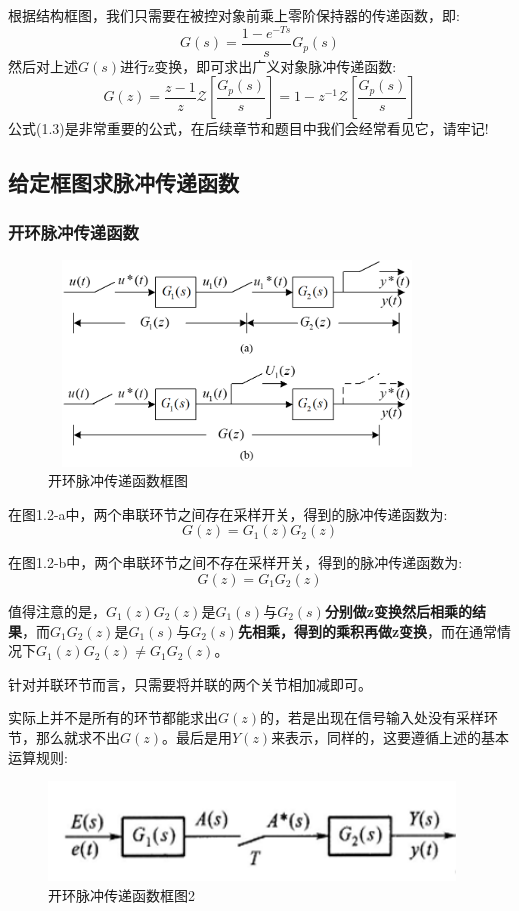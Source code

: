 \documentclass[12pt, a4paper, oneside]{ctexbook}
\begin{document}
根据结构框图，我们只需要在被控对象前乘上零阶保持器的传递函数，即:
$$
G(s)=\frac{1-e^{-Ts}}{s}G_p(s)
$$
然后对上述$G(s)$进行z变换，即可求出广义对象脉冲传递函数:
\begin{equation}
	G(z)=\frac{z-1}{z}\mathcal Z[\frac{G_p(s)}{s}] = 1-z^{-1}\mathcal Z[\frac{G_p(s)}{s}]
\end{equation}
公式(1.3)是非常重要的公式，在后续章节和题目中我们会经常看见它，请牢记!
\subsection{给定框图求脉冲传递函数}
\subsubsection{开环脉冲传递函数}
\begin{figure}[htbp]
	\centering
	\includegraphics[width=10cm,height=5.47cm]{img/1_1.png}
	\caption{开环脉冲传递函数框图}
\end{figure}

在图1.2-a中，两个串联环节之间存在采样开关，得到的脉冲传递函数为:
$$
G(z)=G_1(z)G_2(z)
$$

在图1.2-b中，两个串联环节之间不存在采样开关，得到的脉冲传递函数为:
$$
G(z)=G_1G_2(z)
$$

值得注意的是，$G_1(z)G_2(z)$是$G_1(s)$与$G_2(s)$\textbf{分别做z变换然后相乘的结果}，而$G_1G_2(z)$是$G_1(s)$与$G_2(s)$\textbf{先相乘，得到的乘积再做z变换}，而在通常情况下$G_1(z)G_2(z)\neq G_1G_2(z)$。

针对并联环节而言，只需要将并联的两个关节相加减即可。

实际上并不是所有的环节都能求出$G(z)$的，若是出现在信号输入处没有采样环节，那么就求不出$G(z)$。最后是用$Y(z)$来表示，同样的，这要遵循上述的基本运算规则:
\begin{figure}[htbp]
	\centering
	\includegraphics[width=10.8cm,height=2.64cm]{img/1_2.png}
	\caption{开环脉冲传递函数框图2}
\end{figure}
\end{document}
